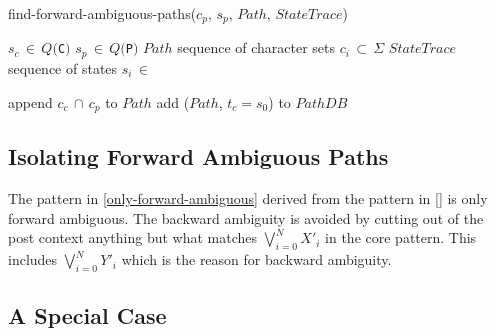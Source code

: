 \begin{algorithm}
\caption{find-forward-ambiguous-paths($c_p$, $s_p$, $Path$, $StateTrace$)}
\label{algo:forward-detector}
\begin{algorithmic}
    \REQUIRE $s_c\,\in\,Q(${\tt C}$)$
    \REQUIRE $s_p\,\in\,Q(${\tt P}$)$
    \REQUIRE $Path$ sequence of character sets $c_i\,\subset\,\Sigma$
    \REQUIRE $StateTrace$ sequence of states $s_i\,\in$ 
    
                \STATE append $c_c\,\cap\,c_p$ to $Path$ 
                    \STATE add ($Path$, $t_c = s_0$) to $PathDB$
                \ENDIF
                    \RETURN \TRUE
                    \RETURN \TRUE
                \ENDIF
            \ENDIF
        \ENDFOR
    \ENDFOR
    \RETURN \FALSE
\end{algorithmic}
\end{algorithm}

\subsection{Isolating Forward Ambiguous Paths}

The pattern in \eqref{only-forward-ambiguous} derived from the pattern in
\eqref{} is only forward ambiguous. The backward ambiguity is avoided by
cutting out of the post context anything but what matches  $\bigvee_{i=0}^{N}
X'_i$ in the core pattern. This includes $\bigvee_{i=0}^{N} Y'_i$ which is
the reason for backward ambiguity.

\subsection{A Special Case}

